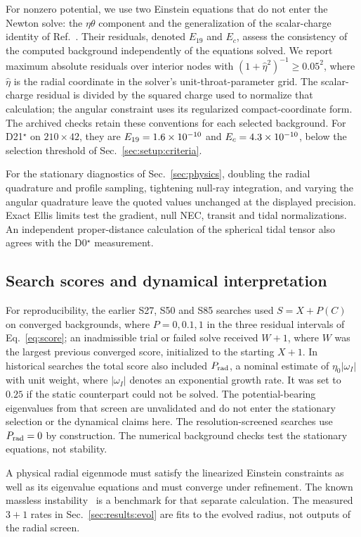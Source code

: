 \documentclass[twocolumn,floatfix,aps,prd,superscriptaddress,nofootinbib]{revtex4-2}
\begin{document}
For nonzero potential, we use two Einstein equations that do not enter the Newton solve: the $\eta\theta$ component and the generalization of the scalar-charge identity of Ref.~\cite{chew2016}. Their residuals, denoted $E_{19}$ and $E_c$, assess the consistency of the computed background independently of the equations solved.
We report maximum absolute residuals over interior nodes with
$(1+\hat\eta^2)^{-1}\ge0.05^2$, where $\hat\eta$ is the radial coordinate
in the solver's unit-throat-parameter grid. The scalar-charge residual
is divided by the squared charge used to normalize that calculation;
the angular constraint uses its regularized compact-coordinate form.
The archived checks retain these conventions for each selected background. For D21$^\star$ on $210\times42$, they are $E_{19}=1.6\times10^{-10}$ and $E_c=4.3\times10^{-10}$, below the selection threshold of Sec.~\ref{sec:setup:criteria}.

For the stationary diagnostics of Sec.~\ref{sec:physics}, doubling the
radial quadrature and profile sampling, tightening null-ray integration,
and varying the angular quadrature leave the quoted values unchanged at
the displayed precision. Exact Ellis limits test the gradient, null NEC,
transit and tidal normalizations. An independent proper-distance calculation
of the spherical tidal tensor also agrees with the D0$^\star$ measurement.

\subsection{Search scores and dynamical interpretation}

For reproducibility, the earlier S27, S50 and S85 searches used $S=X+P(C)$ on
converged backgrounds, where $P=0,0.1,1$ in the three residual intervals
of Eq.~\eqref{eq:score}; an inadmissible trial or failed solve received
$W+1$, where $W$ was the largest previous converged score, initialized to
the starting $X+1$. In historical searches the total score also included
$P_{\rm rad}$, a nominal estimate of $\eta_0|\omega_I|$ with unit weight,
where $|\omega_I|$ denotes an exponential growth rate. It was set to $0.25$ if the static
counterpart could not be solved. The potential-bearing eigenvalues from
that screen are unvalidated and do not enter the stationary selection or
the dynamical claims here. The resolution-screened searches use
$P_{\rm rad}=0$ by construction. The numerical background checks test the
stationary equations, not stability.

A physical radial eigenmode must satisfy the linearized Einstein
constraints as well as its eigenvalue equations and must converge under
refinement. The known massless instability~\cite{gonzalez2009lin,azad2023,azad2024} is a
benchmark for that separate calculation. The measured $3+1$ rates in
Sec.~\ref{sec:results:evol} are fits to the evolved radius, not outputs
of the radial screen.
\end{document}
